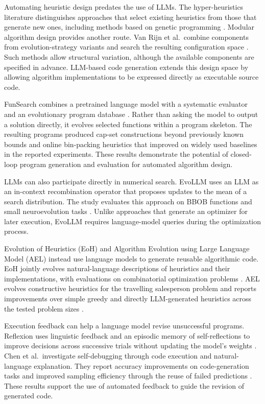 Automating heuristic design predates the use of LLMs. The hyper-heuristics
literature distinguishes approaches that select existing heuristics
from those that generate new ones, including methods based on genetic
programming \cite{Burke2013}. Modular algorithm design provides another
route. Van Rijn et al.\ combine components from evolution-strategy
variants and search the resulting configuration space
\cite{vanRijn2016}. Such methods allow structural variation, although
the available components are specified in advance. LLM-based code
generation extends this design space by allowing algorithm
implementations to be expressed directly as executable source code.

FunSearch combines a pretrained language model with a systematic evaluator
and an evolutionary program database \cite{Romera2023}. Rather than
asking the model to output a solution directly, it evolves selected
functions within a program skeleton. The resulting programs produced
cap-set constructions beyond previously known bounds and online
bin-packing heuristics that improved on widely used baselines in the
reported experiments. These results demonstrate the potential of
closed-loop program generation and evaluation for automated algorithm
design.

LLMs can also participate directly in numerical search. EvoLLM uses
an LLM as an in-context recombination operator that proposes updates
to the mean of a search distribution. The study evaluates this approach
on BBOB functions and small neuroevolution tasks \cite{Lange2024}.
Unlike approaches that generate an optimizer for later execution,
EvoLLM requires language-model queries during the optimization process.

Evolution of Heuristics (EoH) and Algorithm Evolution using Large Language
Model (AEL) instead use language models to generate reusable algorithmic
code. EoH jointly evolves natural-language descriptions of heuristics
and their implementations, with evaluations on combinatorial optimization
problems \cite{Liu2024}. AEL evolves constructive heuristics for the
travelling salesperson problem and reports improvements over simple
greedy and directly LLM-generated heuristics across the tested problem
sizes \cite{AEL2024}.

Execution feedback can help a language model revise unsuccessful
programs. Reflexion uses linguistic feedback and an episodic memory of
self-reflections to improve decisions across successive trials without
updating the model's weights \cite{Shinn2023}. Chen et al.\ investigate
self-debugging through code execution and natural-language explanation.
They report accuracy improvements on code-generation tasks and improved
sampling efficiency through the reuse of failed predictions
\cite{Chen2023}. These results support the use of automated feedback
to guide the revision of generated code.

